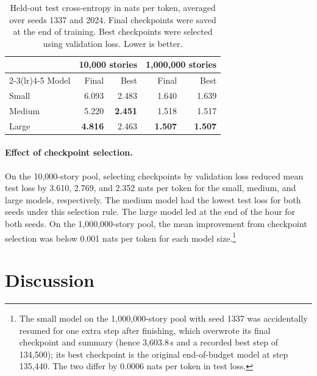 \documentclass[12pt]{article}
\begin{document}
\begin{table}[htbp]
    \centering
    \small
    \caption{Held-out test cross-entropy in nats per token, averaged
    over seeds 1337 and 2024. Final checkpoints were saved at the end
    of training. Best checkpoints were selected using validation loss.
    Lower is better.}
    \label{tab:test-loss}
    \begin{tabular}{lrr rr}
        \toprule
        & \multicolumn{2}{c}{10,000 stories}
        & \multicolumn{2}{c}{1,000,000 stories} \\
        \cmidrule(lr){2-3}\cmidrule(lr){4-5}
        Model & Final & Best & Final & Best \\
        \midrule
        Small  & 6.093 & 2.483 & 1.640 & 1.639 \\
        Medium & 5.220 & \textbf{2.451} & 1.518 & 1.517 \\
        Large  & \textbf{4.816} & 2.463 & \textbf{1.507} & \textbf{1.507} \\
        \bottomrule
    \end{tabular}
\end{table}

\paragraph{Effect of checkpoint selection.}
On the 10,000-story pool, selecting checkpoints by validation loss
reduced mean test loss by 3.610, 2.769, and 2.352 nats per token for
the small, medium, and large models, respectively. The medium model
had the lowest test loss for both seeds under this selection rule.
The large model led at the end of the hour for both seeds. On the
1,000,000-story pool, the mean improvement from checkpoint selection
was below 0.001 nats per token for each model size.\footnote{The small model on the 1,000,000-story pool with seed 1337 was accidentally resumed for one extra step after finishing, which overwrote its final checkpoint and summary (hence 3,603.8\,s and a recorded best step of 134,500); its best checkpoint is the original end-of-budget model at step 135,440. The two differ by 0.0006 nats per token in test loss.}

\section{Discussion}
\label{sec:discussion}
\end{document}
